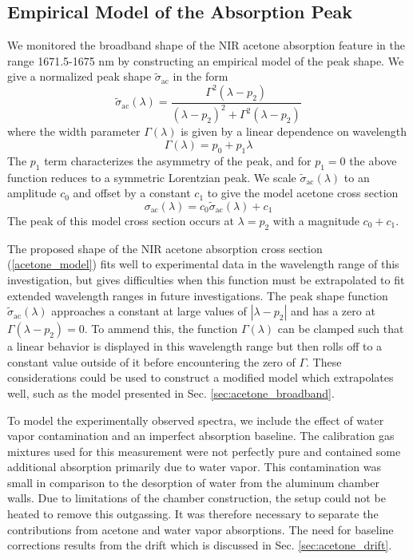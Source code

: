 \documentclass[12pt]{report}
\begin{document}
	\subsection{Empirical Model of the Absorption Peak}
	We monitored the broadband shape of the NIR acetone absorption feature in the range 1671.5-1675 nm by constructing an empirical model of the peak shape. We give a normalized peak shape $\tilde{\sigma}_{\mathrm{ac}}$ in the form
	\begin{equation} \label{sigma_tilde}
		\tilde{\sigma}_{\mathrm{ac}}(\lambda) = \frac{\Gamma^2(\lambda-p_2)}{(\lambda-p_2)^2 + \Gamma^2(\lambda-p_2)}
	\end{equation}
	where the width parameter $\Gamma(\lambda)$ is given by a linear dependence on wavelength
	\begin{equation}\label{Lambda}
		\Gamma(\lambda) = p_0 + p_1 \lambda
	\end{equation}
	The $p_1$ term characterizes the asymmetry of the peak, and for $p_1=0$ the above function reduces to a symmetric Lorentzian peak. We scale $\tilde{\sigma}_{\mathrm{ac}}(\lambda)$ to an amplitude $c_0$ and offset by a constant $c_1$ to give the model acetone cross section
	\begin{equation} \label{acetone_model}
		\sigma_\mathrm{ac}(\lambda) = c_0\tilde{\sigma}_{\mathrm{ac}}(\lambda) + c_1
	\end{equation}
	The peak of this model cross section occurs at $\lambda=p_2$ with a magnitude $c_0 + c_1$.
	
	The proposed shape of the NIR acetone absorption cross section (\ref{acetone_model}) fits well to experimental data in the wavelength range of this investigation, but gives difficulties when this function must be extrapolated to fit extended wavelength ranges in future investigations. The peak shape function $\tilde{\sigma}_{\mathrm{ac}}(\lambda)$ approaches a constant at large values of $\left|\lambda-p_2\right|$ and has a zero at $\Gamma(\lambda-p_2)=0$. To ammend this, the function $\Gamma(\lambda)$ can be clamped such that a linear behavior is displayed in this wavelength range but then rolls off to a constant value outside of it before encountering the zero of $\Gamma$. These considerations could be used to construct a modified model which extrapolates well, such as the model presented in Sec. \ref{sec:acetone_broadband}.
	
	To model the experimentally observed spectra, we include the effect of water vapor contamination and an imperfect absorption baseline. The calibration gas mixtures used for this measurement were not perfectly pure and contained some additional absorption primarily due to water vapor. This contamination was small in comparison to the desorption of water from the aluminum chamber walls. Due to limitations of the chamber construction, the setup could not be heated to remove this outgassing. It was therefore necessary to separate the contributions from acetone and water vapor absorptions. The need for baseline corrections results from the drift which is discussed in Sec. \ref{sec:acetone_drift}.
	
\end{document}
